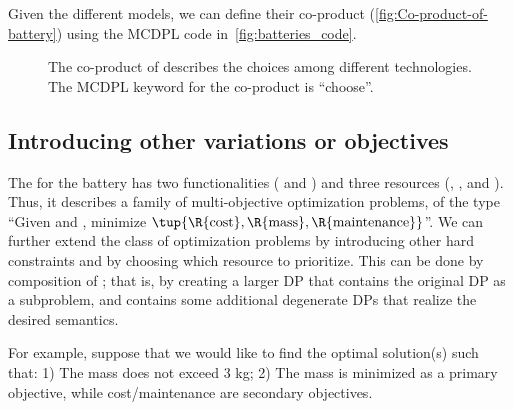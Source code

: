 Given the different models, we can define their co-product (\cref{fig:Co-product-of-battery}) using the MCDPL code in~\cref{fig:batteries_code}.

\begin{figure}[h]

    \caption{
        The co-product of  describes the choices among different technologies.
        The MCDPL keyword for the co-product is ``choose''.
    }
    \label{fig:batteriesbig}
\end{figure}

\subsection{Introducing other variations or objectives}

The  for the battery has two functionalities ( and ) and three resources (, , and ).
Thus, it describes a family of multi-objective optimization problems, of the type ``Given  and , minimize $\tup{ \R{\text{cost}},\R{\text{mass}},\R{\text{maintenance}}}$''.
We can further extend the class of optimization problems by introducing other hard constraints and by choosing which resource to prioritize.
This can be done by composition of ; that is, by creating a larger DP that contains the original DP as a subproblem, and contains some additional degenerate DPs that realize the desired semantics.

For example, suppose that we would like to find the optimal solution(s) such that: 1) The mass does not exceed 3 kg; 2) The mass is minimized as a primary objective, while cost/maintenance are secondary objectives.

